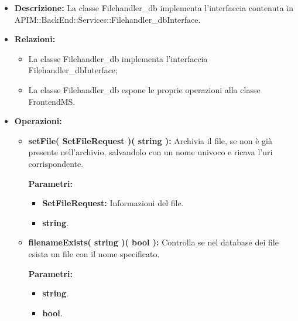 \begin{itemize}
	\item \textbf{Descrizione:} La classe Filehandler\_db implementa l'interfaccia contenuta in APIM::BackEnd::Services::Filehandler\_dbInterface.
	\item \textbf{Relazioni:}
		\begin{itemize}
			\item La classe Filehandler\_db implementa l'interfaccia Filehandler\_dbInterface;
			\item La classe Filehandler\_db espone le proprie operazioni alla classe FrontendMS.
		\end{itemize}
	\item \textbf{Operazioni:}
		\begin{itemize}
		
			\item \textbf{setFile( SetFileRequest )( string ):} Archivia il file, se non è già presente nell'archivio, salvandolo con un nome univoco e ricava l'uri corrispondente.
				\begin{description}
    				\item[\textbf{Parametri:}]
				\end{description}
				\begin{itemize}
					\item \textbf{SetFileRequest:} Informazioni del file.
					\item \textbf{string}.
				\end{itemize}
				
			\item \textbf{filenameExists( string )( bool ):} Controlla se nel database dei file esista un file con il nome specificato.
				\begin{description}
    				\item[\textbf{Parametri:}]
				\end{description}
				\begin{itemize}
					\item \textbf{string}.
					\item \textbf{bool}.
				\end{itemize}
				
		\end{itemize}
\end{itemize}